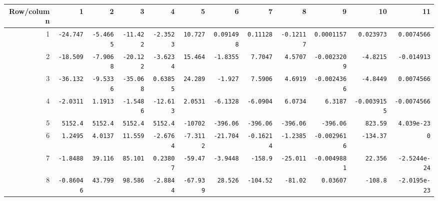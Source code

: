 \begin{landscape}
\begingroup\scriptsize\setlength{\tabcolsep}{3pt}\centering
\begin{tabular}{rrrrrrrrrrrr}\toprule

Row/column & 1 & 2 & 3 & 4 & 5 & 6 & 7 & 8 & 9 & 10 & 11 \\ \midrule

1 & \texttt{-24.747} & \texttt{-5.4665} & \texttt{-11.422} & \texttt{-2.3523} & \texttt{10.727} & \texttt{0.091498} & \texttt{0.11128} & \texttt{-0.12117} & \texttt{0.0001157} & \texttt{0.023973} & \texttt{0.0074566} \\

2 & \texttt{-18.509} & \texttt{-7.9068} & \texttt{-20.122} & \texttt{-3.6234} & \texttt{15.464} & \texttt{-1.8355} & \texttt{7.7047} & \texttt{4.5707} & \texttt{-0.0023209} & \texttt{-4.8215} & \texttt{-0.014913} \\

3 & \texttt{-36.132} & \texttt{-9.5336} & \texttt{-35.068} & \texttt{0.63855} & \texttt{24.289} & \texttt{-1.927} & \texttt{7.5906} & \texttt{4.6919} & \texttt{-0.0024366} & \texttt{-4.8449} & \texttt{0.0074566} \\

4 & \texttt{-2.0311} & \texttt{1.1913} & \texttt{-1.5486} & \texttt{-12.613} & \texttt{2.0531} & \texttt{-6.1328} & \texttt{-6.0904} & \texttt{6.0734} & \texttt{6.3187} & \texttt{-0.0039155} & \texttt{-0.0074566} \\

5 & \texttt{5152.4} & \texttt{5152.4} & \texttt{5152.4} & \texttt{5152.4} & \texttt{-10702} & \texttt{-396.06} & \texttt{-396.06} & \texttt{-396.06} & \texttt{-396.06} & \texttt{823.59} & \texttt{4.039e-23} \\

6 & \texttt{1.2495} & \texttt{4.0137} & \texttt{11.559} & \texttt{-2.6764} & \texttt{-7.3112} & \texttt{-21.704} & \texttt{-0.16214} & \texttt{-1.2385} & \texttt{-0.0029616} & \texttt{-134.37} & \texttt{0} \\

7 & \texttt{-1.8488} & \texttt{39.116} & \texttt{85.101} & \texttt{0.23807} & \texttt{-59.47} & \texttt{-3.9448} & \texttt{-158.9} & \texttt{-25.011} & \texttt{-0.0049881} & \texttt{22.356} & \texttt{-2.5244e-24} \\

8 & \texttt{-0.86046} & \texttt{43.799} & \texttt{98.586} & \texttt{-2.8844} & \texttt{-67.939} & \texttt{28.526} & \texttt{-104.52} & \texttt{-81.02} & \texttt{0.03607} & \texttt{-108.8} & \texttt{-2.0195e-23} \\


\end{tabular}
\end{landscape}
